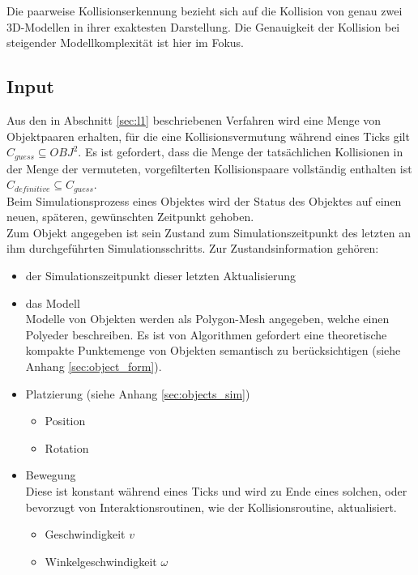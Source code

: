 \label{sec:l2}
Die paarweise Kollisionserkennung bezieht sich auf die Kollision von genau zwei 3D-Modellen in ihrer exaktesten Darstellung. Die Genauigkeit der Kollision bei steigender Modellkomplexität ist hier im Fokus.

\subsection{Input}
Aus den in Abschnitt \ref{sec:l1} beschriebenen Verfahren wird eine Menge von Objektpaaren erhalten, für die eine Kollisionsvermutung während eines Ticks gilt $C_{guess}\subseteq OBJ^2$. Es ist gefordert, dass die Menge der tatsächlichen Kollisionen in der Menge der vermuteten, vorgefilterten Kollisionspaare vollständig enthalten ist $C_{definitive}\subseteq C_{guess}$.\\
Beim Simulationsprozess eines Objektes wird der Status des Objektes auf einen neuen, späteren, gewünschten Zeitpunkt gehoben.\\
Zum Objekt angegeben ist sein Zustand zum Simulationszeitpunkt des letzten an ihm durchgeführten Simulationsschritts. Zur Zustandsinformation gehören:
\begin{itemize}
\item der Simulationszeitpunkt dieser letzten Aktualisierung
\item das Modell\\
Modelle von Objekten werden als Polygon-Mesh \cites{fourcrossfour}{ogl} angegeben, welche einen Polyeder beschreiben. Es ist von Algorithmen gefordert eine theoretische kompakte Punktemenge von Objekten semantisch zu berücksichtigen (siehe Anhang \ref{sec:object_form}).
\item Platzierung (siehe Anhang \ref{sec:objects_sim})
\begin{itemize}
\item Position
\item Rotation
\end{itemize}
\item Bewegung\\
Diese ist konstant während eines Ticks und wird zu Ende eines solchen, oder bevorzugt von Interaktionsroutinen, wie der Kollisionsroutine, aktualisiert.
\begin{itemize}
\item Geschwindigkeit $v$
\item Winkelgeschwindigkeit $\omega$
\end{itemize}
\end{itemize}

